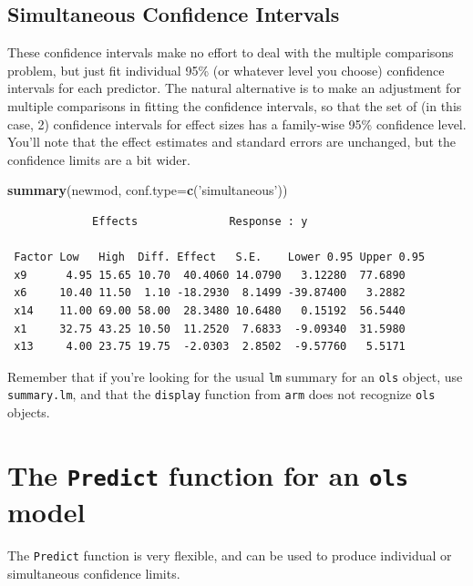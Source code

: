 \documentclass[]{book}
\newenvironment{Shaded}{\begin{snugshade}}{\end{snugshade}}
\newcommand{\KeywordTok}[1]{\textcolor[rgb]{0.13,0.29,0.53}{\textbf{#1}}}
\newcommand{\DataTypeTok}[1]{\textcolor[rgb]{0.13,0.29,0.53}{#1}}
\newcommand{\StringTok}[1]{\textcolor[rgb]{0.31,0.60,0.02}{#1}}
\newcommand{\NormalTok}[1]{#1}
\theoremstyle{definition}
\theoremstyle{definition}
\theoremstyle{definition}
\theoremstyle{remark}
\begin{document}
\subsection{Simultaneous Confidence
Intervals}\label{simultaneous-confidence-intervals}

These confidence intervals make no effort to deal with the multiple
comparisons problem, but just fit individual 95\% (or whatever level you
choose) confidence intervals for each predictor. The natural alternative
is to make an adjustment for multiple comparisons in fitting the
confidence intervals, so that the set of (in this case, 2) confidence
intervals for effect sizes has a family-wise 95\% confidence level.
You'll note that the effect estimates and standard errors are unchanged,
but the confidence limits are a bit wider.

\begin{Shaded}
\begin{Highlighting}[]
\KeywordTok{summary}\NormalTok{(newmod, }\DataTypeTok{conf.type=}\KeywordTok{c}\NormalTok{(}\StringTok{'simultaneous'}\NormalTok{))}
\end{Highlighting}
\end{Shaded}

\begin{verbatim}
             Effects              Response : y 

 Factor Low   High  Diff. Effect   S.E.    Lower 0.95 Upper 0.95
 x9      4.95 15.65 10.70  40.4060 14.0790   3.12280  77.6890   
 x6     10.40 11.50  1.10 -18.2930  8.1499 -39.87400   3.2882   
 x14    11.00 69.00 58.00  28.3480 10.6480   0.15192  56.5440   
 x1     32.75 43.25 10.50  11.2520  7.6833  -9.09340  31.5980   
 x13     4.00 23.75 19.75  -2.0303  2.8502  -9.57760   5.5171   
\end{verbatim}

Remember that if you're looking for the usual \texttt{lm} summary for an
\texttt{ols} object, use \texttt{summary.lm}, and that the
\texttt{display} function from \texttt{arm} does not recognize
\texttt{ols} objects.

\section{\texorpdfstring{The \texttt{Predict} function for an
\texttt{ols}
model}{The Predict function for an ols model}}\label{the-predict-function-for-an-ols-model}

The \texttt{Predict} function is very flexible, and can be used to
produce individual or simultaneous confidence limits.
\end{document}
